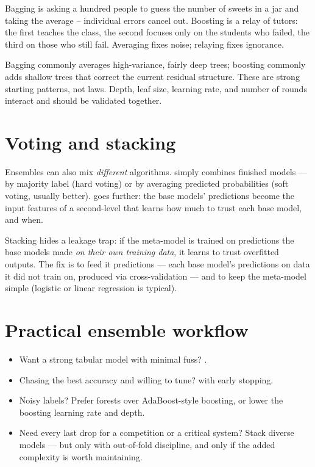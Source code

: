 \begin{analogy}
Bagging is asking a hundred people to guess the number of sweets in a jar and taking the average -- individual errors cancel out. Boosting is a relay of tutors: the first teaches the class, the second focuses only on the students who failed, the third on those who still fail. Averaging fixes noise; relaying fixes ignorance.
\end{analogy}

\begin{keyidea}
Bagging commonly averages high-variance, fairly deep trees; boosting commonly adds shallow trees that correct the current residual structure. These are strong starting patterns, not laws. Depth, leaf size, learning rate, and number of rounds interact and should be validated together.
\end{keyidea}

\section{Voting and stacking}

Ensembles can also mix \emph{different} algorithms.  simply combines finished models --- by majority label (hard voting) or by averaging predicted probabilities (soft voting, usually better).  goes further: the base models' predictions become the input features of a second-level  that learns how much to trust each base model, and when.

Stacking hides a leakage trap: if the meta-model is trained on predictions the base models made \emph{on their own training data}, it learns to trust overfitted outputs. The fix is to feed it  predictions --- each base model's predictions on data it did not train on, produced via cross-validation --- and to keep the meta-model simple (logistic or linear regression is typical).

\section{Practical ensemble workflow}

\begin{itemize}
  \item Want a strong tabular model with minimal fuss? .
  \item Chasing the best accuracy and willing to tune?  with early stopping.
  \item Noisy labels? Prefer forests over AdaBoost-style boosting, or lower the boosting learning rate and depth.
  \item Need every last drop for a competition or a critical system? Stack diverse models --- but only with out-of-fold discipline, and only if the added complexity is worth maintaining.
\end{itemize}


